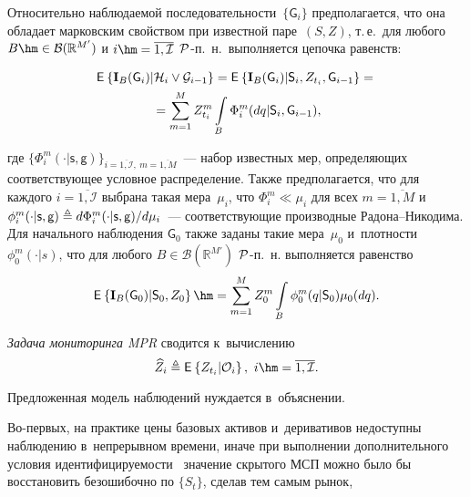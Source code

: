 \begin{multicols}{2}
Относительно наблюдаемой по\-сле\-до\-ва\-тель\-ности~$\{\mathsf{G}_i\}$ предполагается, 
что она обладает марковским свойством при известной паре~$(S,Z)$, т.\,е.\ для   
любого $B \hm\in \mathcal{B}(\mathbb{R}^{M'})$
и $i \hm= \overline{1,\mathcal{I}}$
${\mathcal P}$-п.~н.\ выполняется цепочка равенств:

\vspace*{-6pt}

\noindent
\begin{multline}
\mathsf{E}_{  }\left\{ \mathop{\mathbf{I}_B(\mathsf{G}_i)|\mathcal{H}_i \vee \mathcal{G}_{i-1}} \right\} =
\mathsf{E}_{  }\left\{ \mathop{\mathbf{I}_B(\mathsf{G}_i)|\mathsf{S}_i, Z_{t_i}, \mathsf{G}_{i-1}} \right\} ={}\\
{}=
\sum\limits_{m=1}^M Z_{t_i}^m \int\limits_{B} \Phi_i^m(dq | \mathsf{S}_i,  \mathsf{G}_{i-1}),
\label{eq:vars}
\end{multline}

\vspace*{-6pt}

\noindent
где $\{\Phi_i^m(\cdot | \mathsf{s},  \mathsf{g})\}_{i=\overline{1,\mathcal{I}},\
m=\overline{1,M}}$~--- набор известных мер, определяющих соответствующее 
условное распределение. Также предполагается, что для каждого 
$i=\overline{1,\mathcal{I}}$ выбрана такая мера~$\mu_i$, что $\Phi_i^m \ll 
\mu_i$ для всех $m=\overline{1,M}$ и~$\phi_i^m(\cdot | \mathsf{s},  \mathsf{g}) 
\triangleq {d \Phi_i^m}(\cdot | \mathsf{s},  \mathsf{g})/{d \mu_i}$~--- 
со\-от\-вет\-ст\-ву\-ющие производные Ра\-до\-на--Ни\-ко\-ди\-ма. Для начального наблюдения 
$\mathsf{G}_0$ также заданы такие мера~$\mu_0$ и~плот\-ности $\phi_0^m(\cdot | s)$, что для любого $B \in \mathcal{B}(\mathbb{R}^{M'})$ 
${\mathcal P}$-п.~н. 
выполняется равенство
$$
\me{}{\mathbf{I}_B(\mathsf{G}_0)|\mathsf{S}_0, Z_{0}}\hm =
\sum\limits_{m=1}^M Z_{0}^m \int\limits_{B} \phi_0^m(q | \mathsf{S}_0)\mu_0(dq).
$$

\textit{Задача мониторинга MPR} сводится к~вы\-чис\-лению 
$$
\widehat{Z}_i \ebd  \me{}{Z_{t_i}|\mathcal{O}_i},\ i\hm=\overline{1,\mathcal{I}}.
$$

Предложенная модель наблюдений нуждается в~объяснении. 

Во-первых, на практике 
цены базовых активов и~деривативов недоступны наблюдению в~непрерывном времени, 
иначе при выполнении дополнительного условия иден\-ти\-фи\-ци\-ру\-емости~\cite{BS_20} 
значение скрытого МСП мож\-но было бы восстановить безошибочно по $\{S_t\}$, 
сделав тем самым рынок,\linebreak\vspace*{-12pt}


\end{multicols}
